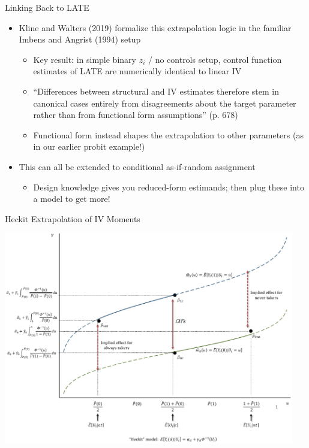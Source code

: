 \documentclass[11pt,english]{beamer}
\begin{document}
\begin{frame}{Linking Back to LATE}

\vspace{0.2cm}
\begin{itemize}
\item Kline and Walters (2019) formalize this extrapolation logic in the familiar Imbens and Angrist (1994) setup\smallskip
\begin{itemize}
\item Key result: in simple binary $z_i$ / no controls setup, control function estimates of LATE are numerically identical to linear IV\smallskip\pause{}
\item ``Differences between structural and IV estimates therefore stem in canonical cases entirely from disagreements about the target parameter rather than from functional form assumptions'' (p. 678)\smallskip\pause{}
\item Functional form instead shapes the extrapolation to other parameters (as in our earlier probit example!)
\end{itemize}\bigskip\pause{}

\item This can all be extended to conditional as-if-random assignment \smallskip
\begin{itemize}
\item Design knowledge gives you reduced-form estimands; then plug these into a model to get more!
\end{itemize}
\end{itemize}

\end{frame}

\begin{frame}{Heckit Extrapolation of IV Moments}

\begin{center}
	\includegraphics[width=0.95\textwidth]{figures/kw_heckit.png}
\end{center}
\end{frame}
\end{document}
